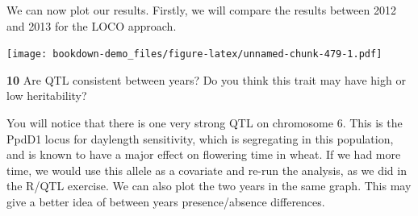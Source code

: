 \documentclass[
]{book}
\makeatletter
\newenvironment{Shaded}{\begin{snugshade}}{\end{snugshade}}
\newcommand{\AttributeTok}[1]{\textcolor[rgb]{0.77,0.63,0.00}{#1}}
\newcommand{\CommentTok}[1]{\textcolor[rgb]{0.56,0.35,0.01}{\textit{#1}}}
\newcommand{\DecValTok}[1]{\textcolor[rgb]{0.00,0.00,0.81}{#1}}
\newcommand{\FloatTok}[1]{\textcolor[rgb]{0.00,0.00,0.81}{#1}}
\newcommand{\FunctionTok}[1]{\textcolor[rgb]{0.00,0.00,0.00}{#1}}
\newcommand{\NormalTok}[1]{#1}
\newcommand{\OtherTok}[1]{\textcolor[rgb]{0.56,0.35,0.01}{#1}}
\newcommand{\SpecialCharTok}[1]{\textcolor[rgb]{0.00,0.00,0.00}{#1}}
\newcommand{\StringTok}[1]{\textcolor[rgb]{0.31,0.60,0.02}{#1}}
\newenvironment{kframe}{%
\medskip{}
\setlength{\fboxsep}{.8em}
 \def\at@end@of@kframe{}%
 \ifinner\ifhmode%
  \def\at@end@of@kframe{\end{minipage}}%
  \begin{minipage}{\columnwidth}%
 \fi\fi%
 \def\FrameCommand##1{\hskip\@totalleftmargin \hskip-\fboxsep
 \colorbox{shadecolor}{##1}\hskip-\fboxsep
     \hskip-\linewidth \hskip-\@totalleftmargin \hskip\columnwidth}%
 \MakeFramed {\advance\hsize-\width
   \@totalleftmargin\z@ \linewidth\hsize
   \@setminipage}}%
 {\par\unskip\endMakeFramed%
 \at@end@of@kframe}
\newenvironment{rmdblock}[1]
  {
  \begin{itemize}
  \renewcommand{\labelitemi}{
    \raisebox{-.7\height}[0pt][0pt]{
      {\setkeys{Gin}{width=3em,keepaspectratio}\texttt{[image: images/\#1]}}
    }
  }
  \setlength{\fboxsep}{1em}
  \begin{kframe}
  \item
  }
  {
  \end{kframe}
  \end{itemize}
  }
\newenvironment{rmdquiz}
  {\begin{rmdblock}{quiz}}
  {\end{rmdblock}}
\makeatother
\begin{document}
We can now plot our results. Firstly, we will compare the results between 2012 and 2013 for the LOCO approach.

\begin{Shaded}
\end{Shaded}

\texttt{[image: bookdown-demo\_files/figure-latex/unnamed-chunk-479-1.pdf]}
\begin{rmdquiz}
\textbf{10}
Are QTL consistent between years? Do you think this trait may have high or low heritability?
\end{rmdquiz}

You will notice that there is one very strong QTL on chromosome 6. This is the PpdD1 locus for daylength sensitivity, which is segregating in this population, and is known to have a major effect on flowering time in wheat. If we had more time, we would use this allele as a covariate and re-run the analysis, as we did in the R/QTL exercise. We can also plot the two years in the same graph. This may give a better idea of between years presence/absence differences.
\end{document}
